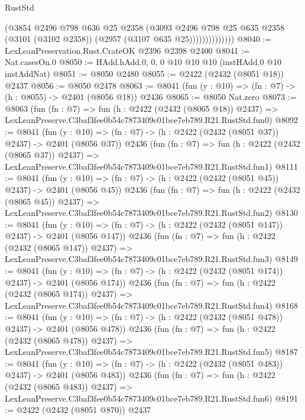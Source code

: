 \begin{lexlean}{RustStd}
\begin{coremodule}
                        (@3854
                          @2496
                          @798
                          @636
                          @25
                          @2358
                          (@3093
                            @2496
                            @798
                            @25
                            @635
                            @2358
                            (@3101 (@3102 @2358))
                            (@2957 (@3107 @635 @25))))))))))))))
@8040 := LexLeanPreservation.Rust.CrateOK @2396 @2398 @2400
@8041 := Nat.casesOn.{0}
@8050 := HAdd.hAdd.{0, 0, 0} @10 @10 @10 (instHAdd.{0} @10 instAddNat)
@8051 := @8050 @2480
@8055 := @2422 (@2432 (@8051 @18)) @2437
@8056 := @8050 @2478
@8063 := @8041 (fun (y : @10) => (fn : @7) -> (h : @8055) -> @2401 (@8056 @18)) @2436
@8065 := @8050 Nat.zero
@8073 := @8063
    (fun (fn : @7) =>
    fun (h : @2422 (@2432 (@8065 @18)) @2437) =>
    LexLeanPreserve.C3baf3fee0b54c7873409c01bce7eb789.R21.RustStd.fun0)
@8092 := @8041
    (fun (y : @10) => (fn : @7) -> (h : @2422 (@2432 (@8051 @37)) @2437) -> @2401 (@8056 @37))
    @2436
    (fun (fn : @7) =>
    fun (h : @2422 (@2432 (@8065 @37)) @2437) =>
    LexLeanPreserve.C3baf3fee0b54c7873409c01bce7eb789.R21.RustStd.fun1)
@8111 := @8041
    (fun (y : @10) => (fn : @7) -> (h : @2422 (@2432 (@8051 @45)) @2437) -> @2401 (@8056 @45))
    @2436
    (fun (fn : @7) =>
    fun (h : @2422 (@2432 (@8065 @45)) @2437) =>
    LexLeanPreserve.C3baf3fee0b54c7873409c01bce7eb789.R21.RustStd.fun2)
@8130 := @8041
    (fun (y : @10) => (fn : @7) -> (h : @2422 (@2432 (@8051 @147)) @2437) -> @2401 (@8056 @147))
    @2436
    (fun (fn : @7) =>
    fun (h : @2422 (@2432 (@8065 @147)) @2437) =>
    LexLeanPreserve.C3baf3fee0b54c7873409c01bce7eb789.R21.RustStd.fun3)
@8149 := @8041
    (fun (y : @10) => (fn : @7) -> (h : @2422 (@2432 (@8051 @174)) @2437) -> @2401 (@8056 @174))
    @2436
    (fun (fn : @7) =>
    fun (h : @2422 (@2432 (@8065 @174)) @2437) =>
    LexLeanPreserve.C3baf3fee0b54c7873409c01bce7eb789.R21.RustStd.fun4)
@8168 := @8041
    (fun (y : @10) => (fn : @7) -> (h : @2422 (@2432 (@8051 @478)) @2437) -> @2401 (@8056 @478))
    @2436
    (fun (fn : @7) =>
    fun (h : @2422 (@2432 (@8065 @478)) @2437) =>
    LexLeanPreserve.C3baf3fee0b54c7873409c01bce7eb789.R21.RustStd.fun5)
@8187 := @8041
    (fun (y : @10) => (fn : @7) -> (h : @2422 (@2432 (@8051 @483)) @2437) -> @2401 (@8056 @483))
    @2436
    (fun (fn : @7) =>
    fun (h : @2422 (@2432 (@8065 @483)) @2437) =>
    LexLeanPreserve.C3baf3fee0b54c7873409c01bce7eb789.R21.RustStd.fun6)
@8191 := @2422 (@2432 (@8051 @870)) @2437

\end{coremodule}
\end{lexlean}
